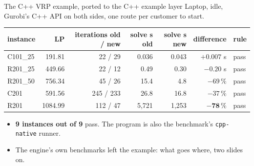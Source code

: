 \documentclass[aspectratio=169]{beamer}
\begin{document}
\begin{frame}{The C++ VRP example, ported to the C++ example layer}
  \small Laptop, idle, Gurobi's C++ API on both sides, one route per customer to start.

  \vspace{0.3em}
  \footnotesize
  \begin{tabular}{@{}lrrrrrl@{}}
    \toprule
    instance & LP & iterations old / new & solve s old & solve s new & difference & rule \\
    \midrule
    C101\_25 & 191.81 & 22 / 29 & 0.036 & 0.043 & $+0.007$ s & pass \\
    R201\_25 & 449.66 & 22 / 12 & 0.49 & 0.30 & $-0.20$ s & pass \\
    R201\_50 & 756.34 & 45 / 26 & 15.4 & 4.8 & $-69$\,\% & pass \\
    C201 & 591.56 & 245 / 233 & 26.8 & 16.8 & $-37$\,\% & pass \\
    R201 & 1084.99 & 112 / 47 & 5,721 & 1,253 & $\mathbf{-78}$\,\% & pass \\
    \bottomrule
  \end{tabular}

  \vspace{0.5em}
  \begin{itemize}\small
    \item \textbf{9 instances out of 9} pass. The program is also the benchmark's \texttt{cpp-native} runner.
    \item The engine's own benchmarks left the example: what goes where, two slides on.
  \end{itemize}
\end{frame}
\end{document}

